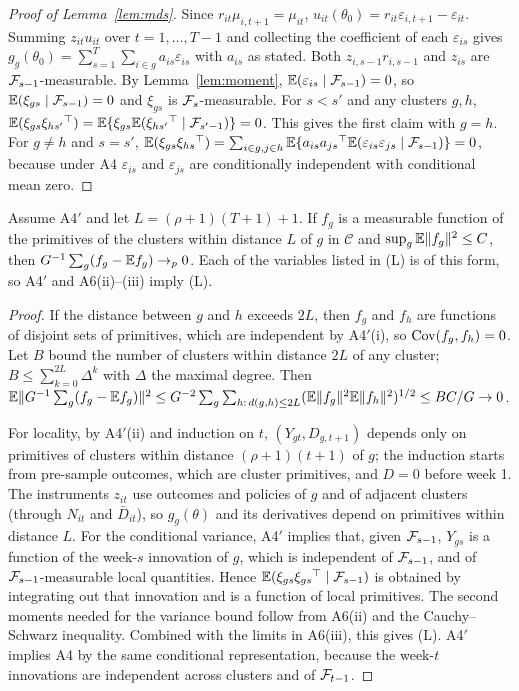 \begin{proof}[Proof of Lemma~\ref{lem:mds}]
Since $r_{it}\mu_{i,t+1}=\mu_{it}$, $u_{it}(\theta_0)=r_{it}\varepsilon_{i,t+1}-\varepsilon_{it}$. Summing
$z_{it}u_{it}$ over $t=1,\dots,T-1$ and collecting the coefficient of each $\varepsilon_{is}$ gives
$g_g(\theta_0)=\sum_{s=1}^T\sum_{i\in g}a_{is}\varepsilon_{is}$ with $a_{is}$ as stated. Both
$z_{i,s-1}r_{i,s-1}$ and $z_{is}$ are $\mathcal{F}_{s-1}$-measurable. By Lemma~\ref{lem:moment},
$\mathbb{E}(\varepsilon_{is}\mid\mathcal{F}_{s-1})=0$, so $\mathbb{E}(\xi_{gs}\mid\mathcal{F}_{s-1})=0$ and $\xi_{gs}$ is $\mathcal{F}_s$-measurable.
For $s<s'$ and any clusters $g,h$,
$\mathbb{E}(\xi_{gs}\xi_{hs'}{}^{\top})=\mathbb{E}\{\xi_{gs}\mathbb{E}(\xi_{hs'}{}^{\top}\mid\mathcal{F}_{s'-1})\}=0$. This gives the first
claim with $g=h$. For $g\ne h$ and $s=s'$,
$\mathbb{E}(\xi_{gs}\xi_{hs}{}^{\top})=\sum_{i\in g,j\in h}\mathbb{E}\{a_{is}a_{js}{}^{\top}\mathbb{E}(\varepsilon_{is}\varepsilon_{js}\mid\mathcal{F}_{s-1})\}=0$,
because under A4 $\varepsilon_{is}$ and $\varepsilon_{js}$ are conditionally independent with
conditional mean zero.
\end{proof}

\begin{lemma}
\label{lem:lln}
Assume A4$'$ and let $L=(\rho+1)(T+1)+1$. If $f_g$ is a measurable function of the primitives of
the clusters within distance $L$ of $g$ in $\mathcal C$ and $\sup_g\mathbb{E}\|f_g\|^2\le C$, then
$G^{-1}\sum_g(f_g-\mathbb{E} f_g)\to_p0$. Each of the variables listed in (L) is of this form, so A4$'$
and A6(ii)--(iii) imply (L).
\end{lemma}

\begin{proof}
If the distance between $g$ and $h$ exceeds $2L$, then $f_g$ and $f_h$ are functions of
disjoint sets of primitives, which are independent by A4$'$(i), so $\operatorname{Cov}(f_g,f_h)=0$. Let $B$
bound the number of clusters within distance $2L$ of any cluster; $B\le\sum_{k=0}^{2L}\Delta^k$
with $\Delta$ the maximal degree. Then
$\mathbb{E}\|G^{-1}\sum_g(f_g-\mathbb{E} f_g)\|^2\le G^{-2}\sum_g\sum_{h:\,d(g,h)\le2L}(\mathbb{E}\|f_g\|^2\mathbb{E}\|f_h\|^2)^{1/2}\le BC/G\to0$.

For locality, by A4$'$(ii) and induction on $t$, $(Y_{gt},D_{g,t+1})$ depends only on primitives of
clusters within distance $(\rho+1)(t+1)$ of $g$; the induction starts from pre-sample outcomes,
which are cluster primitives, and $D=0$ before week 1. The instruments $z_{it}$ use outcomes and
policies of $g$ and of adjacent clusters (through $N_{it}$ and $\bar D_{it}$), so $g_g(\theta)$ and
its derivatives depend on primitives within distance $L$. For the conditional variance, A4$'$
implies that, given $\mathcal{F}_{s-1}$, $Y_{gs}$ is a function of the week-$s$ innovation of $g$, which is
independent of $\mathcal{F}_{s-1}$, and of $\mathcal{F}_{s-1}$-measurable local quantities. Hence
$\mathbb{E}(\xi_{gs}\xi_{gs}{}^{\top}\mid\mathcal{F}_{s-1})$ is obtained by integrating out that innovation and is a
function of local primitives. The second moments needed for the variance bound follow from
A6(ii) and the Cauchy--Schwarz inequality. Combined with the limits in A6(iii), this gives (L).
A4$'$ implies A4 by the same conditional representation, because the week-$t$ innovations are
independent across clusters and of $\mathcal{F}_{t-1}$.
\end{proof}

